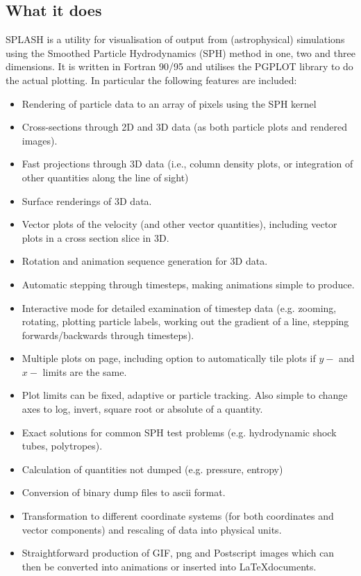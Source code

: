 \documentclass[a4paper,10pt]{article}
\newcommand{\splash}{\textsc{SPLASH }}
\begin{document}
\subsection{What it does}
\splash is a utility for visualisation of output from (astrophysical) simulations using the
Smoothed Particle Hydrodynamics (SPH) method in one, two and three dimensions.
It is written in Fortran 90/95 and utilises the PGPLOT library to do the actual plotting. In particular the following
features are included:
\begin{itemize}
\item Rendering of particle data to an array of pixels using the SPH kernel
\item Cross-sections through 2D and 3D data (as both particle plots and rendered
images).
\item Fast projections through 3D data (i.e., column density plots, or integration of
other quantities along the line of sight)
\item Surface renderings of 3D data.
\item Vector plots of the velocity (and other vector quantities), including vector
plots in a cross section slice in 3D.
\item Rotation and animation sequence generation for 3D data.
\item Automatic stepping through timesteps, making animations simple to produce.
\item Interactive mode for detailed examination of timestep data (e.g. zooming,
rotating, plotting particle labels, working out the gradient of a line, stepping forwards/backwards
through timesteps).
\item Multiple plots on page, including option to automatically tile plots if $y-$ and $x-$ limits
are the same.
\item Plot limits can be fixed, adaptive or particle tracking. Also simple to change
axes to log, invert, square root or absolute of a quantity.
\item Exact solutions for common SPH test problems (e.g. hydrodynamic shock tubes,
polytropes).
\item Calculation of quantities not dumped (e.g. pressure, entropy)
\item Conversion of binary dump files to ascii format.
\item Transformation to different coordinate systems (for both coordinates and
vector components) and rescaling of data into physical units.
\item Straightforward production of GIF, png and Postscript images which can then be
converted into animations or inserted into \LaTeX documents.
\end{itemize}
\end{document}
